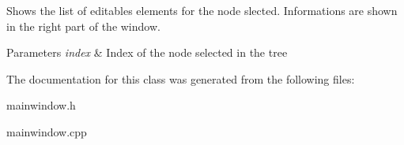 Shows the list of editables elements for the node slected. Informations are shown in the right part of the window. 


\begin{DoxyParams}{Parameters}
{\em index} & Index of the node selected in the tree \\
\hline
\end{DoxyParams}


The documentation for this class was generated from the following files\-:\begin{DoxyCompactItemize}
\item 
mainwindow.\-h\item 
mainwindow.\-cpp\end{DoxyCompactItemize}
